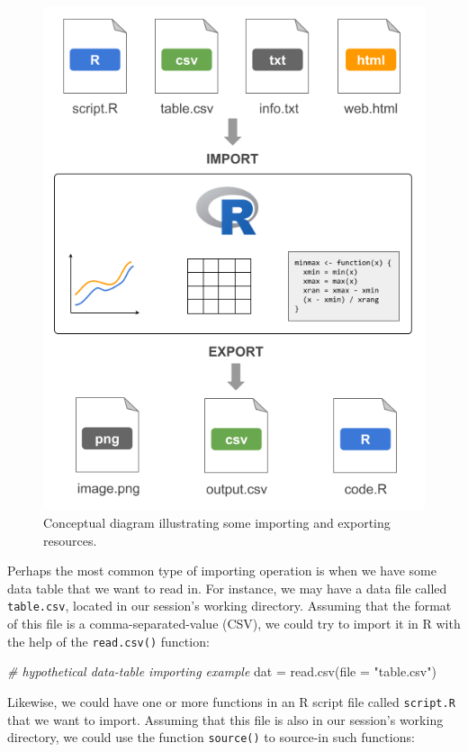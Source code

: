 \documentclass[
]{book}
\newenvironment{Shaded}{\begin{snugshade}}{\end{snugshade}}
\newcommand{\AttributeTok}[1]{\textcolor[rgb]{0.77,0.63,0.00}{#1}}
\newcommand{\CommentTok}[1]{\textcolor[rgb]{0.56,0.35,0.01}{\textit{#1}}}
\newcommand{\FunctionTok}[1]{\textcolor[rgb]{0.00,0.00,0.00}{#1}}
\newcommand{\NormalTok}[1]{#1}
\newcommand{\OtherTok}[1]{\textcolor[rgb]{0.56,0.35,0.01}{#1}}
\newcommand{\StringTok}[1]{\textcolor[rgb]{0.31,0.60,0.02}{#1}}
\begin{document}
\begin{figure}

{\centering \includegraphics[width=0.6\linewidth]{images/inout/import-export-resources} 

}

\caption{Conceptual diagram illustrating some importing and exporting resources.}\label{fig:unnamed-chunk-354}
\end{figure}

Perhaps the most common type of importing operation is when we have some data
table that we want to read in. For instance, we may have a data file called
\texttt{table.csv}, located in our session's working directory. Assuming that the
format of this file is a comma-separated-value (CSV), we could try to import
it in R with the help of the \texttt{read.csv()} function:

\begin{Shaded}
\begin{Highlighting}[]
\CommentTok{\# hypothetical data{-}table importing example}
\NormalTok{dat }\OtherTok{=} \FunctionTok{read.csv}\NormalTok{(}\AttributeTok{file =} \StringTok{"table.csv"}\NormalTok{)}
\end{Highlighting}
\end{Shaded}

Likewise, we could have one or more functions in an R script file called
\texttt{script.R} that we want to import. Assuming that this file is also in our
session's working directory, we could use the function \texttt{source()} to source-in
such functions:
\end{document}
